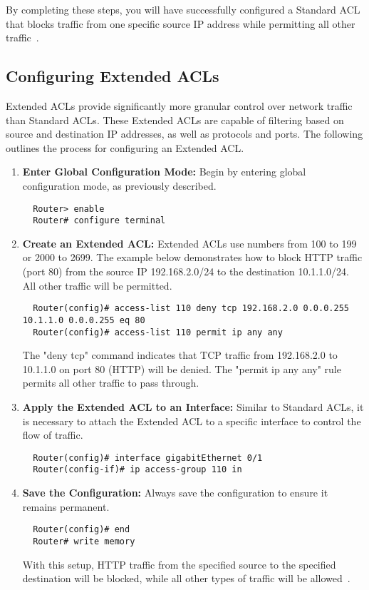 \documentclass[11pt,a4paper]{article}
\begin{document}
        By completing these steps, you will have successfully configured a Standard ACL that blocks traffic from one specific source IP address while permitting all other traffic~\cite{Configuring-Standard-ACLs}. 

    \subsection*{Configuring Extended ACLs}
        Extended ACLs provide significantly more granular control over network traffic than Standard ACLs. These Extended ACLs are capable of filtering based on source and destination IP addresses, as well as protocols and ports. The following outlines the process for configuring an Extended ACL.
        \begin{enumerate}
           \item \textbf{Enter Global Configuration Mode:} Begin by entering global configuration mode, as previously described.
\begin{lstlisting}
  Router> enable
  Router# configure terminal    
\end{lstlisting}
            \item \textbf{Create an Extended ACL:} Extended ACLs use numbers from 100 to 199 or 2000 to 2699. The example below demonstrates how to block HTTP traffic (port 80) from the source IP 192.168.2.0/24 to the destination 10.1.1.0/24. All other traffic will be permitted.

\begin{lstlisting}
  Router(config)# access-list 110 deny tcp 192.168.2.0 0.0.0.255 10.1.1.0 0.0.0.255 eq 80
  Router(config)# access-list 110 permit ip any any    
\end{lstlisting}

            The "deny tcp" command indicates that TCP traffic from 192.168.2.0 to 10.1.1.0 on port 80 (HTTP) will be denied. The "permit ip any any" rule permits all other traffic to pass through.

            \item \textbf{Apply the Extended ACL to an Interface:} Similar to Standard ACLs, it is necessary to attach the Extended ACL to a specific interface to control the flow of traffic.
\begin{lstlisting}
  Router(config)# interface gigabitEthernet 0/1
  Router(config-if)# ip access-group 110 in   
\end{lstlisting}
            \item \textbf{Save the Configuration:} Always save the configuration to ensure it remains permanent.
\begin{lstlisting}
  Router(config)# end
  Router# write memory 
\end{lstlisting}

            With this setup, HTTP traffic from the specified source to the specified destination will be blocked, while all other types of traffic will be allowed~\cite{Configuring-Extended-ACLs}.

        \end{enumerate}
\end{document}
